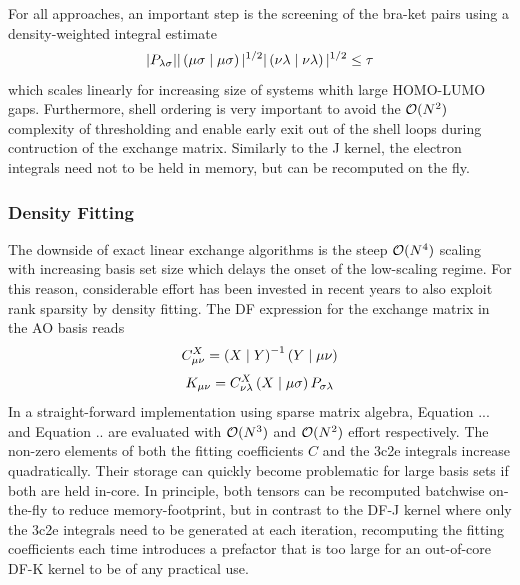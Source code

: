 For all approaches, an important step is the screening of the bra-ket pairs using a density-weighted integral estimate
\begin{equation}
|P_{\lambda\sigma}||\left( \mu\sigma \mid \mu\sigma \right)|^{1/2} |\left( \nu\lambda \mid \nu\lambda \right)|^{1/2} \leq \tau
\end{equation}
\noindent which scales linearly for increasing size of systems whith large HOMO-LUMO gaps. Furthermore, shell ordering is very important to avoid the $\mathcal{O}(N^{2})$ complexity of thresholding and enable early exit out of the shell loops during contruction of the exchange matrix. Similarly to the J kernel, the electron integrals need not to be held in memory, but can be recomputed on the fly.


\subsubsection{Density Fitting}

The downside of exact linear exchange algorithms is the steep $\mathcal{O}(N^{4})$ scaling with increasing basis set size which delays the onset of the low-scaling regime. For this reason, considerable effort has been invested in recent years to also exploit rank sparsity by density fitting. The DF expression for the exchange matrix in the AO basis reads
\begin{equation}
C^X_{\mu\nu} = \left( X \mid Y \right)^{-1} \left( Y \mid \mu\nu \right)
\end{equation}
\begin{equation}
K_{\mu\nu} = C^X_{\nu\lambda} \left( X \mid \mu \sigma \right) P_{\sigma\lambda}
\end{equation}
\noindent In a straight-forward implementation using sparse matrix algebra, Equation ... and Equation .. are evaluated with $\mathcal{O}(N^{3})$  and $\mathcal{O}(N^{2})$ effort respectively. The non-zero elements of both the fitting coefficients $C$ and the 3c2e integrals increase quadratically. Their storage can quickly become problematic for large basis sets if both are held in-core. In principle, both tensors can be recomputed batchwise on-the-fly to reduce memory-footprint, but in contrast to the DF-J kernel where only the 3c2e integrals need to be generated at each iteration, recomputing the fitting coefficients each time introduces a prefactor that is too large for an out-of-core DF-K kernel to be of any practical use. 

